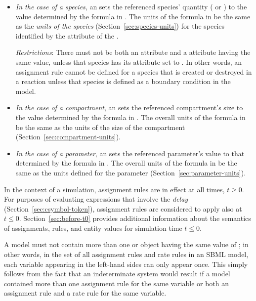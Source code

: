 \begin{itemize}
  
\item \emph{In the case of a species}, an \AssignmentRule sets the
  referenced species' quantity ( or
  ) to the value determined by the
  formula in .  The units of the formula in
    be the same as the \emph{units of the species}
  (Section~\ref{sec:species-units}) for the species identified by
  the  attribute of the \AssignmentRule.
  
  \emph{Restrictions}: There must not be both an \AssignmentRule
   attribute and a \SpeciesReference {}
  attribute having the same value, unless that species has its
   attribute set to .  In other
  words, an assignment rule cannot be defined for a species that
  is created or destroyed in a reaction unless that species is
  defined as a boundary condition in the model.

\item \emph{In the case of a compartment}, an \AssignmentRule sets
  the referenced compartment's size to the value determined by the
  formula in .  The overall units of the formula in
    be the same as the units of the size of the
  compartment (Section~\ref{sec:compartment-units}).
  
\item \emph{In the case of a parameter}, an \AssignmentRule sets
  the referenced parameter's value to that determined by the
  formula in .  The overall units of the formula in
    be the same as the units defined for the
  parameter (Section~\ref{sec:parameter-units}).

\end{itemize}

In the context of a simulation, assignment rules are in effect at
all times, $t \geq 0$.  For purposes of evaluating expressions
that involve the \emph{delay} 
(Section~\ref{sec:csymbol-token}), assignment rules are considered
to apply also at $t \leq 0$.  Section~\ref{sec:before-t0} provides
additional information about the semantics of assignments, rules,
and entity values for simulation time $t \leq 0$.

A model must not contain more than one \AssignmentRule or
\RateRule object having the same value of ; in
other words, in the set of all assignment rules and rate rules in
an SBML model, each variable appearing in the left-hand sides can
only appear once.  This simply follows from the fact that an
indeterminate system would result if a model contained more than
one assignment rule for the same variable or both an assignment
rule and a rate rule for the same variable.

